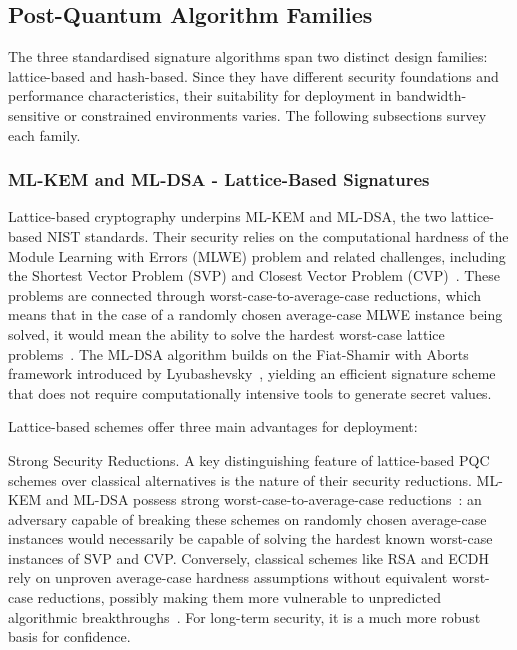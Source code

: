 \documentclass[12pt,a4paper]{article}
\begin{document}
\subsection{Post-Quantum Algorithm Families}

The three standardised signature algorithms span two distinct design families: lattice-based and hash-based. Since they have different security foundations and performance characteristics, their suitability for deployment in bandwidth-sensitive or constrained environments varies. The following subsections survey each family.

\subsubsection{ML-KEM and ML-DSA - Lattice-Based Signatures}

Lattice-based cryptography underpins ML-KEM and ML-DSA, the two lattice-based NIST standards. Their security relies on the computational hardness of the Module Learning with Errors (MLWE) problem and related challenges, including the Shortest Vector Problem (SVP) and Closest Vector Problem (CVP)~\cite{nist-fips-203-2024,nist-fips-204-2024,regev2009}. These problems are connected through worst-case-to-average-case reductions, which means that in the case of a randomly chosen average-case MLWE instance being solved, it would mean the ability to solve the hardest worst-case lattice problems~\cite{regev2009}. The ML-DSA algorithm builds on the Fiat-Shamir with Aborts framework introduced by Lyubashevsky~\cite{lyubashevsky2012}, yielding an efficient signature scheme that does not require computationally intensive tools to generate secret values.

Lattice-based schemes offer three main advantages for deployment:

Strong Security Reductions. A key distinguishing feature of lattice-based PQC schemes over classical alternatives is the nature of their security reductions. ML-KEM and ML-DSA possess strong worst-case-to-average-case reductions~\cite{nist-fips-203-2024}: an adversary capable of breaking these schemes on randomly chosen average-case instances would necessarily be capable of solving the hardest known worst-case instances of SVP and CVP. Conversely, classical schemes like RSA and ECDH rely on unproven average-case hardness assumptions without equivalent worst-case reductions, possibly making them more vulnerable to unpredicted algorithmic breakthroughs~\cite{nist-fips-203-2024,nist-fips-204-2024}. For long-term security, it is a much more robust basis for confidence.
\end{document}

